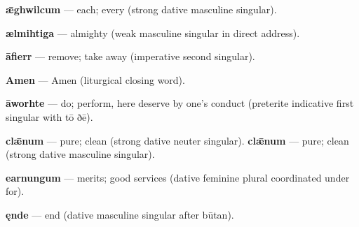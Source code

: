 \textbf{ǣghwilcum} — each; every (strong dative masculine singular).

\textbf{ælmihtiga} — almighty (weak masculine singular in direct address).

\textbf{āfierr} — remove; take away (imperative second singular).

\textbf{Amen} — Amen (liturgical closing word).

\textbf{āworhte} — do; perform, here deserve by one's conduct (preterite indicative first singular with tō ðē).

\textbf{clǣnum} — pure; clean (strong dative neuter singular). \textbf{clǣnum} — pure; clean (strong dative masculine singular).

\textbf{earnungum} — merits; good services (dative feminine plural coordinated under for).

\textbf{ęnde} — end (dative masculine singular after būtan).

